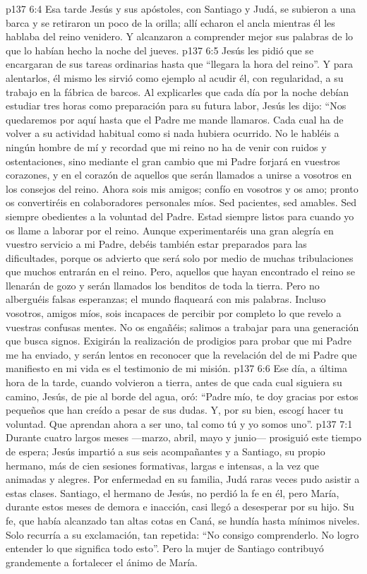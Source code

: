 \vs p137 6:4 \pc Esa tarde Jesús y sus apóstoles, con Santiago y Judá, se subieron a una barca y se retiraron un poco de la orilla; allí echaron el ancla mientras él les hablaba del reino venidero. Y alcanzaron a comprender mejor sus palabras de lo que lo habían hecho la noche del jueves.
\vs p137 6:5 Jesús les pidió que se encargaran de sus tareas ordinarias hasta que “llegara la hora del reino”. Y para alentarlos, él mismo les sirvió como ejemplo al acudir él, con regularidad, a su trabajo en la fábrica de barcos. Al explicarles que cada día por la noche debían estudiar tres horas como preparación para su futura labor, Jesús les dijo: “Nos quedaremos por aquí hasta que el Padre me mande llamaros. Cada cual ha de volver a su actividad habitual como si nada hubiera ocurrido. No le habléis a ningún hombre de mí y recordad que mi reino no ha de venir con ruidos y ostentaciones, sino mediante el gran cambio que mi Padre forjará en vuestros corazones, y en el corazón de aquellos que serán llamados a unirse a vosotros en los consejos del reino. Ahora sois mis amigos; confío en vosotros y os amo; pronto os convertiréis en colaboradores personales míos. Sed pacientes, sed amables. Sed siempre obedientes a la voluntad del Padre. Estad siempre listos para cuando yo os llame a laborar por el reino. Aunque experimentaréis una gran alegría en vuestro servicio a mi Padre, debéis también estar preparados para las dificultades, porque os advierto que será solo por medio de muchas tribulaciones que muchos entrarán en el reino. Pero, aquellos que hayan encontrado el reino se llenarán de gozo y serán llamados los benditos de toda la tierra. Pero no alberguéis falsas esperanzas; el mundo flaqueará con mis palabras. Incluso vosotros, amigos míos, sois incapaces de percibir por completo lo que revelo a vuestras confusas mentes. No os engañéis; salimos a trabajar para una generación que busca signos. Exigirán la realización de prodigios para probar que mi Padre me ha enviado, y serán lentos en reconocer que la revelación del  de mi Padre que manifiesto en mi vida es el testimonio de mi misión.
\vs p137 6:6 Ese día, a última hora de la tarde, cuando volvieron a tierra, antes de que cada cual siguiera su camino, Jesús, de pie al borde del agua, oró: “Padre mío, te doy gracias por estos pequeños que han creído a pesar de sus dudas. Y, por su bien, escogí hacer tu voluntad. Que aprendan ahora a ser uno, tal como tú y yo somos uno”.
\vs p137 7:1 Durante cuatro largos meses ---marzo, abril, mayo y junio--- prosiguió este tiempo de espera; Jesús impartió a sus seis acompañantes y a Santiago, su propio hermano, más de cien sesiones formativas, largas e intensas, a la vez que animadas y alegres. Por enfermedad en su familia, Judá raras veces pudo asistir a estas clases. Santiago, el hermano de Jesús, no perdió la fe en él, pero María, durante estos meses de demora e inacción, casi llegó a desesperar por su hijo. Su fe, que había alcanzado tan altas cotas en Caná, se hundía hasta mínimos niveles. Solo recurría a su exclamación, tan repetida: “No consigo comprenderlo. No logro entender lo que significa todo esto”. Pero la mujer de Santiago contribuyó grandemente a fortalecer el ánimo de María.
